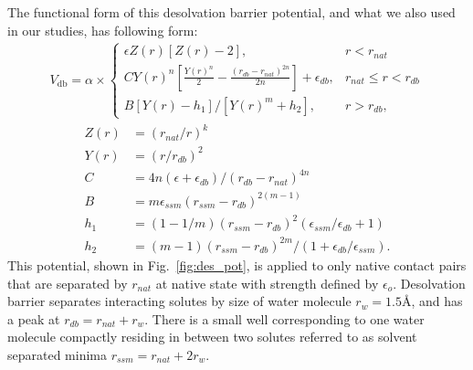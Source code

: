 \documentclass[../talant.diss.submit.tex]{subfiles}
\begin{document}
The functional form of this
desolvation barrier potential, and what we also used in our studies, has following form:
%
%
\begin{align}  
  \label{eq:db_main}
  V_{\mathrm{db}}= \alpha\times %
  \begin{cases} 
    \epsilon Z(r)[Z(r)-2], & r<r_{nat}
    \\ CY(r)^{n}[\frac{Y(r)^{n}}{2}-\frac{(r_{db}-r_{nat})^{2n}}{2n}]
    +\epsilon_{db} ,  &  r_{nat} \le r < r_{db}
    \\ B[Y(r)-h_{1}]/[Y(r)^{m}+h_{2}], & r > r_{db}, 
  \end{cases}
\end{align}
%
\begin{align}
  \label{eq:db_parts}
  Z(r)&= (r_{nat}/r)^{k}   \nonumber \\
  Y(r)&=(r/r_{db})^{2}  \nonumber  \\
  C   &=4n(\epsilon+\epsilon_{db})/(r_{db}-r_{nat})^{4n}  \\
  B   &=m\epsilon_{ssm}(r_{ssm}-r_{db})^{2(m-1)} \nonumber \\
  h_{1}&=(1-1/m)(r_{ssm}-r_{db})^{2}(\epsilon_{ssm}/\epsilon_{db}+1)\nonumber \\
  h_{2}&=(m-1)(r_{ssm}-r_{db})^{2m}/(1+\epsilon_{db}/\epsilon_{ssm}).  \nonumber
\end{align}
%
This potential, shown in Fig.~\ref{fig:des_pot}, is applied to only native contact pairs
that are separated by $r_{nat}$ at native state with strength defined by $\epsilon_o$.
Desolvation barrier separates interacting solutes by size of water molecule $r_w = 1.5$\AA, and has a peak at $r_{db}=r_{nat} + r_{w}$. There is a small well corresponding to one water molecule compactly
residing in between two solutes referred to as solvent separated minima $r_{ssm}=r_{nat}+2r_{w}$.
\end{document}
